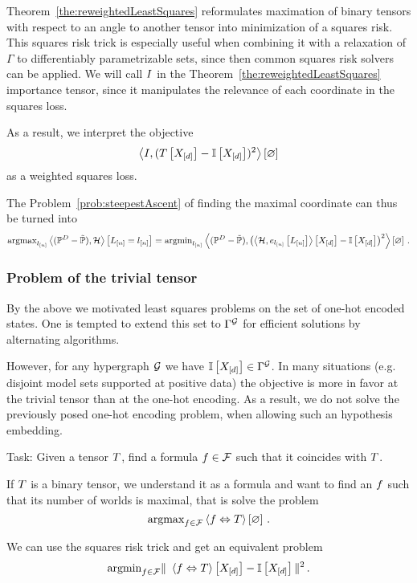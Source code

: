 Theorem~\ref{the:reweightedLeastSquares} reformulates maximation of binary tensors with respect to an angle to another tensor into minimization of a squares risk.
This squares risk trick is especially useful when combining it with a relaxation of $\Gamma$ to differentiably parametrizable sets, since then common squares risk solvers can be applied.
We will call $I$ in the Theorem~\ref{the:reweightedLeastSquares} importance tensor, since it manipulates the relevance of each coordinate in the squares loss.

%
As a result, we interpret the objective
	\[ \left\langle I, (T\left[X_{[d]}\right]-\mathbb{I}\left[X_{[d]}\right])^2\right\rangle \left[ \varnothing \right] \]
as a weighted squares loss.

\begin{example}
	The Problem~\ref{prob:steepestAscent} of finding the maximal coordinate can thus be turned into
	\begin{align*}
		\mathrm{argmax}_{l_{[n]}} \left\langle (\mathbb{P}^{D}-\tilde{\mathbb{P}}),\mathcal{H}\right\rangle \left[ L_{[n]}=l_{[n]} \right]  
		= \mathrm{argmin}_{l_{[n]}} \left\langle (\mathbb{P}^{D}-\tilde{\mathbb{P}}),
		\left(\left\langle \mathcal{H},e_{l_{[n]}}\left[L_{[n]}\right]\right\rangle \left[ X_{[d]} \right]-\mathbb{I}\left[X_{[d]}\right]\right)^2\right\rangle \left[ \varnothing \right] \, . 
	\end{align*}
\end{example}


\subsubsection{Problem of the trivial tensor}

By the above we motivated least squares problems on the set of one-hot encoded states.
One is tempted to extend this set to $\Gamma^{\mathcal{G}}$ for efficient solutions by alternating algorithms.

However, for any hypergraph $\mathcal{G}$ we have $\mathbb{I}\left[X_{[d]}\right]\in\Gamma^{\mathcal{G}}$.
In many situations (e.g. disjoint model sets supported at positive data) the objective is more in favor at the trivial tensor than at the one-hot encoding.
As a result, we do not solve the previously posed one-hot encoding problem, when allowing such an hypothesis embedding.


\begin{example}\label{exa:formulaFitting}
	Task: Given a tensor $T$, find a formula $f\in\mathcal{F}$ such that it coincides with $T$.

	If $T$ is a binary tensor, we understand it as a formula and want to find an $f$ such that its number of worlds is maximal, that is solve the problem
		\[ \mathrm{argmax}_{f\in\mathcal{F}}\left\langle f\Leftrightarrow T\right\rangle \left[ \varnothing \right]  \, . \]

	We can use the squares risk trick and get an equivalent problem
		\[ \argmin_{\exformula\in\formulaset} \| \sbcontractionof{\exformula\Leftrightarrow\hypercore}{\shortcatvariables}  - \onesat{\shortcatvariables} \|^2 \, . \]
\end{example}

